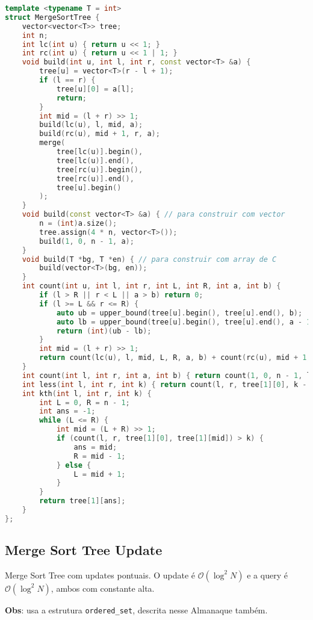 \documentclass[10pt, a4paper, oneside]{book}
\begin{document}
\begin{lstlisting}[language=C++]
template <typename T = int>
struct MergeSortTree {
    vector<vector<T>> tree;
    int n;
    int lc(int u) { return u << 1; }
    int rc(int u) { return u << 1 | 1; }
    void build(int u, int l, int r, const vector<T> &a) {
        tree[u] = vector<T>(r - l + 1);
        if (l == r) {
            tree[u][0] = a[l];
            return;
        }
        int mid = (l + r) >> 1;
        build(lc(u), l, mid, a);
        build(rc(u), mid + 1, r, a);
        merge(
            tree[lc(u)].begin(),
            tree[lc(u)].end(),
            tree[rc(u)].begin(),
            tree[rc(u)].end(),
            tree[u].begin()
        );
    }
    void build(const vector<T> &a) { // para construir com vector
        n = (int)a.size();
        tree.assign(4 * n, vector<T>());
        build(1, 0, n - 1, a);
    }
    void build(T *bg, T *en) { // para construir com array de C
        build(vector<T>(bg, en));
    }
    int count(int u, int l, int r, int L, int R, int a, int b) {
        if (l > R || r < L || a > b) return 0;
        if (l >= L && r <= R) {
            auto ub = upper_bound(tree[u].begin(), tree[u].end(), b);
            auto lb = upper_bound(tree[u].begin(), tree[u].end(), a - 1);
            return (int)(ub - lb);
        }
        int mid = (l + r) >> 1;
        return count(lc(u), l, mid, L, R, a, b) + count(rc(u), mid + 1, r, L, R, a, b);
    }
    int count(int l, int r, int a, int b) { return count(1, 0, n - 1, l, r, a, b); }
    int less(int l, int r, int k) { return count(l, r, tree[1][0], k - 1); }
    int kth(int l, int r, int k) {
        int L = 0, R = n - 1;
        int ans = -1;
        while (L <= R) {
            int mid = (L + R) >> 1;
            if (count(l, r, tree[1][0], tree[1][mid]) > k) {
                ans = mid;
                R = mid - 1;
            } else {
                L = mid + 1;
            }
        }
        return tree[1][ans];
    }
};
\end{lstlisting}
\hfill

\subsection{Merge Sort Tree Update}


Merge Sort Tree com updates pontuais. O update é $\mathcal{O}(\log^2 N)$ e a query é $\mathcal{O}(\log^2 N)$, ambos com constante alta.



\textbf{Obs}: usa a estrutura \texttt{ordered\_set}, descrita nesse Almanaque também.
\hfill
\end{document}
